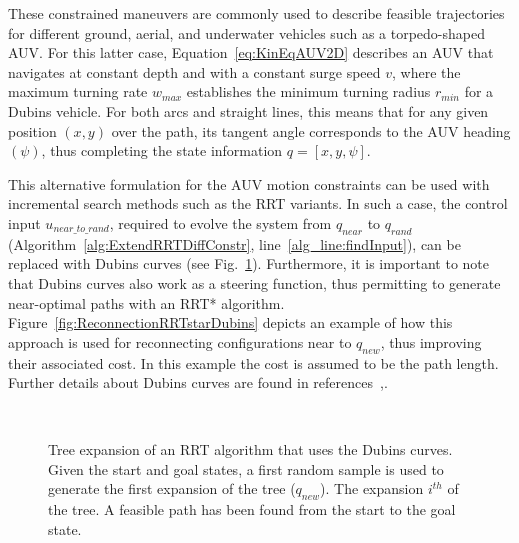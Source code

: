These constrained maneuvers are commonly used to describe feasible trajectories
for different ground, aerial, and underwater vehicles such as a torpedo-shaped
\ac{AUV}. For this latter case, Equation~\eqref{eq:KinEqAUV2D} describes an
\ac{AUV} that navigates at constant depth and with a constant surge speed $v$,
where the maximum turning rate $w_{max}$ establishes the minimum turning radius
$r_{min}$ for a Dubins vehicle. For both arcs and straight lines, this means
that for any given position $(x,y)$ over the path, its tangent angle corresponds
to the \ac{AUV} heading $(\psi)$, thus completing the state information
$q=[x,y,\psi]$.

This alternative formulation for the \ac{AUV} motion constraints can be used
with incremental search methods such as the \ac{RRT} variants. In such a case,
the control input $u_{near\_ to\_rand}$, required to evolve the system from
$q_{near}$ to $q_{rand}$ (Algorithm~\ref{alg:ExtendRRTDiffConstr},
line~\ref{alg_line:findInput}), can be replaced with Dubins curves (see
Fig.~\ref{fig:ExpansionRRTDubins}). Furthermore, it is important to note that
Dubins curves also work as a steering function, thus permitting to generate
near-optimal paths with an \ac{RRT*} algorithm.
Figure~\ref{fig:ReconnectionRRTstarDubins} depicts an example of how this
approach is used for reconnecting configurations near to $q_{new}$, thus
improving their associated cost. In this example the cost is assumed to be the path
length. Further details about Dubins curves are found in
references~\cite{Dubins1957},\cite{Shkel2001}.

\begin{figure}[htbp]
    \myfloatalign
     \quad
     \\
\caption[Start-to-goal query solution by expanding an RRT algorithm with Dubins
curves.] {Tree expansion of an \ac{RRT} algorithm that uses the Dubins curves.
\protect {} Given the start and goal states, a
first random sample is used to generate the first expansion of the tree
($q_{new}$).
\protect {} The expansion $i^{th}$ of the tree.
\protect {} A feasible path has been found from
the start to the goal state.}
\label{fig:ExpansionRRTDubins}
\end{figure}

